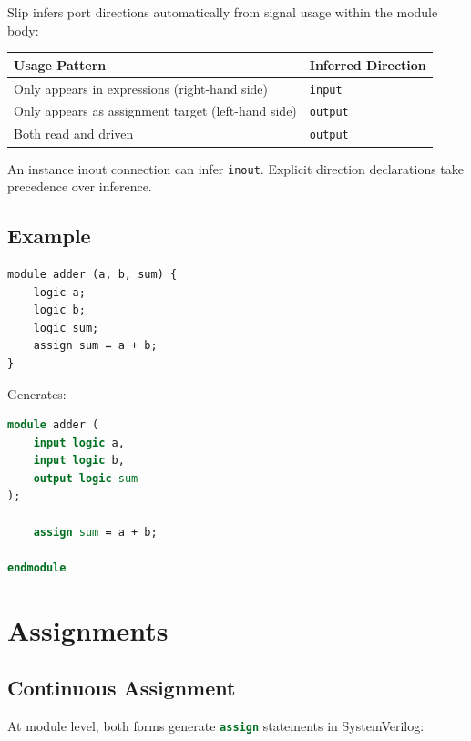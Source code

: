 \documentclass[lang=en,11pt]{elegantbook}
\newcommand{\code}[1]{\texttt{#1}}
\newcommand{\svinline}[1]{\lstinline[language=SystemVerilog]|#1|}
\begin{document}
Slip infers port directions automatically from signal usage within the module body:

\begin{table}[htbp]
\centering
\begin{tabular}{ll}
\toprule
\textbf{Usage Pattern} & \textbf{Inferred Direction} \\
\midrule
Only appears in expressions (right-hand side) & \code{input} \\
Only appears as assignment target (left-hand side) & \code{output} \\
Both read and driven & \code{output} \\
\bottomrule
\end{tabular}
\end{table}

An instance inout connection can infer \code{inout}. Explicit direction
declarations take precedence over inference.

\section{Example}

\begin{lstlisting}[language=Slip]
module adder (a, b, sum) {
    logic a;
    logic b;
    logic sum;
    assign sum = a + b;
}
\end{lstlisting}

Generates:

\begin{lstlisting}[language=SystemVerilog]
module adder (
    input logic a,
    input logic b,
    output logic sum
);

    assign sum = a + b;

endmodule
\end{lstlisting}

\chapter{Assignments}

\section{Continuous Assignment}

At module level, both forms generate \svinline{assign} statements in SystemVerilog:
\end{document}
